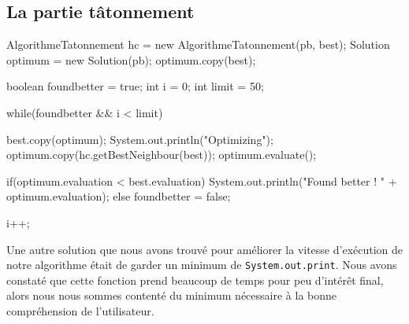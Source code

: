 \vspace{1em}

\subsection{La partie tâtonnement}

\begin{java}
AlgorithmeTatonnement hc = new AlgorithmeTatonnement(pb, best);
Solution optimum = new Solution(pb);
optimum.copy(best);

boolean foundbetter = true;
int i = 0;
int limit = 50;

while(foundbetter && i < limit) {
	best.copy(optimum);
	System.out.println("Optimizing");
	optimum.copy(hc.getBestNeighbour(best));
	optimum.evaluate();
	
	if(optimum.evaluation < best.evaluation) {
		System.out.println("Found better ! " + optimum.evaluation);
	}
	else {
		foundbetter = false;
	}
	
	i++;
}
\end{java}

\vspace{1em}

Une autre solution que nous avons trouvé pour améliorer la vitesse  d'exécution de notre algorithme était de garder un minimum de \verb!System.out.print!. Nous avons constaté que cette fonction prend beaucoup de temps pour peu d'intérêt final, alors nous nous sommes contenté du minimum nécessaire à la bonne compréhension de l'utilisateur.